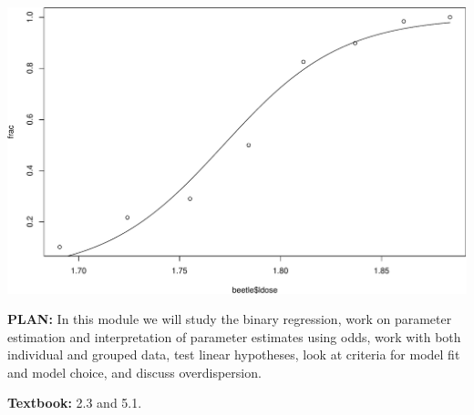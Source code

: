 \documentclass[
  ignorenonframetext,
]{beamer}
\newenvironment{Shaded}{\begin{snugshade}}{\end{snugshade}}
\newcommand{\AttributeTok}[1]{\textcolor[rgb]{0.13,0.29,0.53}{#1}}
\newcommand{\DecValTok}[1]{\textcolor[rgb]{0.00,0.00,0.81}{#1}}
\newcommand{\FunctionTok}[1]{\textcolor[rgb]{0.13,0.29,0.53}{\textbf{#1}}}
\newcommand{\NormalTok}[1]{#1}
\newcommand{\OtherTok}[1]{\textcolor[rgb]{0.56,0.35,0.01}{#1}}
\newcommand{\SpecialCharTok}[1]{\textcolor[rgb]{0.81,0.36,0.00}{\textbf{#1}}}
\newcommand{\StringTok}[1]{\textcolor[rgb]{0.31,0.60,0.02}{#1}}
\begin{document}
\begin{frame}[fragile]
\tiny

\begin{Shaded}
\end{Shaded}

\includegraphics{1Intro_files/figure-beamer/unnamed-chunk-1-1.pdf}

\normalsize
\end{frame}

\begin{frame}
\textbf{PLAN:} In this module we will study the binary regression, work
on parameter estimation and interpretation of parameter estimates using
odds, work with both individual and grouped data, test linear
hypotheses, look at criteria for model fit and model choice, and discuss
overdispersion.

\textbf{Textbook:} 2.3 and 5.1.
\end{frame}
\end{document}
